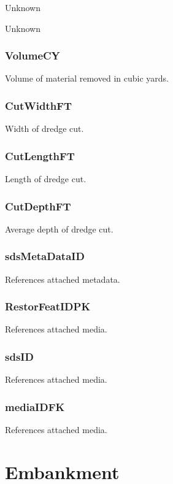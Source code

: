 \documentclass[
  letterpaper,
  DIV=11,
  numbers=noendperiod]{scrreprt}
\begin{document}
Unknown

Unknown

\subsection{VolumeCY}\label{volumecy}

Volume of material removed in cubic yards.

\subsection{CutWidthFT}\label{cutwidthft}

Width of dredge cut.

\subsection{CutLengthFT}\label{cutlengthft}

Length of dredge cut.

\subsection{CutDepthFT}\label{cutdepthft}

Average depth of dredge cut.

\subsection{sdsMetaDataID}\label{sdsmetadataid}

References attached metadata.

\subsection{RestorFeatIDPK}\label{restorfeatidpk}

References attached media.

\subsection{sdsID}\label{sdsid}

References attached media.

\subsection{mediaIDFK}\label{mediaidfk}

References attached media.

\chapter{Embankment}\label{embankment}
\end{document}
